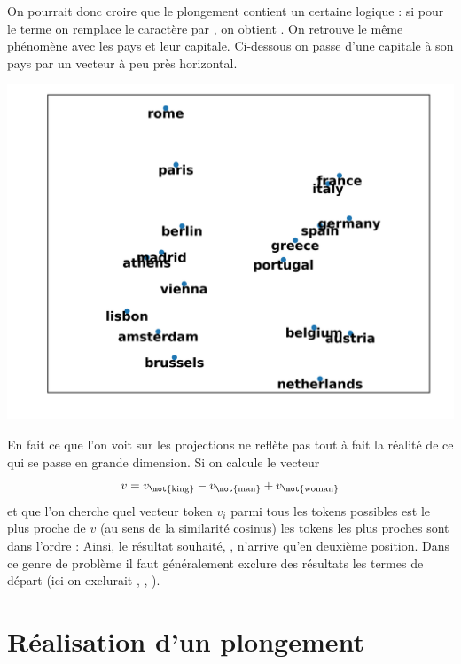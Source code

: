 \documentclass[11pt,class=report,crop=false]{standalone}
\begin{document}
On pourrait donc croire que le plongement contient un certaine logique : si pour le terme  on remplace le caractère  par , on obtient .
On retrouve le même phénomène avec les pays et leur capitale. Ci-dessous on passe d'une capitale à son pays par un vecteur à peu près horizontal.
\begin{center}
	\includegraphics[scale=\myscale,scale=0.6]{figures/projection-pca-6}
\end{center}

En fait ce que l'on voit sur les projections ne reflète pas tout à fait la réalité de ce qui se passe en grande dimension. Si on calcule le vecteur 
$$v =  v_{\text{\mot{king}}} - v_{\text{\mot{man}}} + v_{\text{\mot{woman}}}$$
et que l'on cherche quel vecteur token $v_i$ parmi tous les tokens possibles est le plus proche de $v$ (au sens de la similarité cosinus) les tokens les plus proches sont dans l'ordre :
Ainsi, le résultat souhaité, , n'arrive qu'en deuxième position. Dans ce genre de problème il faut généralement exclure des résultats les termes de départ (ici on exclurait , , ).



\section{Réalisation d'un plongement}
\end{document}
